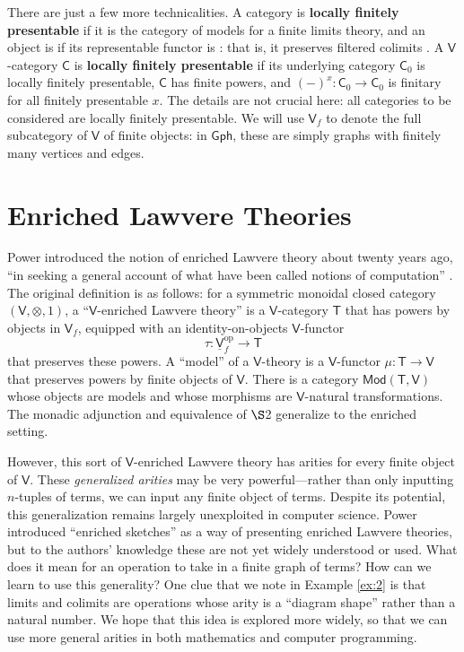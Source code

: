 \documentclass{amsart}
\newcommand{\define}[1]{{\bf \boldmath{#1}}}
\theoremstyle{definition}
\newcommand{\Gph}{\mathsf{Gph}}
\newcommand{\Mod}{\mathsf{Mod}}
\newcommand{\V}{\mathsf{V}}
\newcommand{\C}{\mathsf{C}}
\newcommand{\T}{\mathsf{T}}
\newcommand{\op}{\mathrm{op}}
\newcommand{\maps}{\colon}
\begin{document}
There are just a few more technicalities. A category is \textbf{locally finitely presentable} if it is the category of models for a finite limits theory, and an object is \define{finite} if its representable functor is \define{finitary}: that is, it preserves filtered colimits \cite{adamekrosicky}.   A $\V$-category $\C$ is \textbf{locally finitely presentable} if its underlying category $\C_0$ is locally finitely presentable, $\C$ has finite powers, and $(-)^x\maps \C_0 \to \C_0$ is finitary for all finitely presentable $x$.  The details are not crucial here: all categories to be considered are locally finitely presentable. We will use  $\V_f$ to denote the full subcategory of $\V$ of finite objects: in $\Gph$, these are simply graphs with finitely many vertices and edges.

\section{Enriched Lawvere Theories}
\label{sec:enriched_lawvere}

Power introduced the notion of enriched Lawvere theory about twenty years ago, ``in seeking a general account of what have been called notions of computation'' \cite{power}. The original definition is as follows: for a symmetric monoidal closed category $(\V,\otimes,1)$, a ``$\V$-enriched Lawvere theory'' is a $\V$-category $\T$ that has powers by objects in $\V_f$, equipped with an identity-on-objects $\V$-functor 
\[  \tau\maps \underline{\V}_f^\op \to \T \]
that preserves these powers.  A ``model'' of a $\V$-theory is a $\V$-functor $\mu\maps\T \to \V$ that preserves powers by finite objects of $\V$.  There is a category $\Mod(\T,\V)$ whose objects are models and whose morphisms are $\V$-natural transformations. The monadic adjunction and equivalence of $\S$2 generalize to the enriched setting.

However, this sort of $\V$-enriched Lawvere theory has arities for every finite object of $\V$.  These \textit{generalized arities} may be very powerful---rather than only inputting $n$-tuples of terms, we can input any finite object of terms.  Despite its potential, this generalization remains largely unexploited in computer science.   Power \cite{powsketch} introduced ``enriched sketches'' as a way of presenting enriched Lawvere theories, but to the authors' knowledge these are not yet widely understood or used.  What does it mean for an operation to take in a finite graph of terms?  How can we learn to use this generality? One clue that we note in Example \ref{ex:2} is that limits and colimits are operations whose arity is a ``diagram shape'' rather than a natural number. We hope that this idea is explored more widely, so that we can use more general arities in both mathematics and computer programming.
\end{document}
